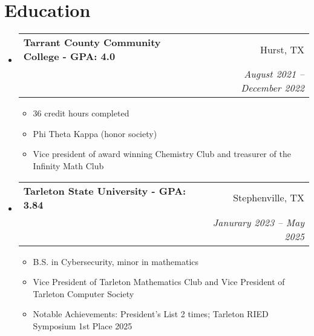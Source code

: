 \documentclass[letterpaper,11pt]{article}
\makeatletter
\newcommand{\resumeItem}[1]{
  \item\small{
    {#1 \vspace{-2pt}}
  }
}
\newcommand{\resumeSubheading}[4]{
  \vspace{-2pt}\item
    \begin{tabular*}{0.97\textwidth}[t]{l@{\extracolsep{\fill}}r}
      \textbf{#1} & #2 \\
      \textit{\small#3} & \textit{\small #4} \\
    \end{tabular*}\vspace{-7pt}
}
\newcommand{\resumeSubHeadingListStart}{\begin{itemize}[leftmargin=0.15in, label={}]}
\newcommand{\resumeSubHeadingListEnd}{\end{itemize}}
\newcommand{\resumeItemListStart}{\begin{itemize}}
\newcommand{\resumeItemListEnd}{\end{itemize}\vspace{-5pt}}
\makeatother
\begin{document}
\section{Education}
\resumeSubHeadingListStart
    \resumeSubheading
      {Tarrant County Community College \textnormal{- GPA: 4.0}}{Hurst, TX}
      {}{August 2021 -- December 2022}
      \resumeItemListStart
        \resumeItem{36 credit hours completed}
        \resumeItem{Phi Theta Kappa (honor society)}
        \resumeItem{Vice president of award winning Chemistry Club and treasurer of the Infinity Math Club}
      \resumeItemListEnd
  \resumeSubHeadingListEnd
  \resumeSubHeadingListStart
    \resumeSubheading
      {Tarleton State University \textnormal{- GPA: 3.84}}{Stephenville, TX}
      {}{Janurary 2023 -- May 2025}
      \resumeItemListStart
        \resumeItem{B.S. in Cybersecurity, minor in mathematics}
        \resumeItem{Vice President of Tarleton Mathematics Club and Vice President of Tarleton Computer Society}
        \resumeItem{Notable Achievements: President's List 2 times; Tarleton RIED Symposium 1st Place 2025}
      \resumeItemListEnd
  \resumeSubHeadingListEnd

\end{document}
